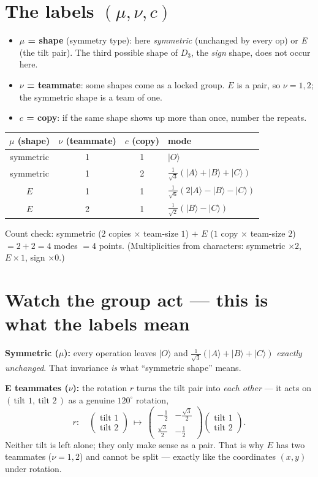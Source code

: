 \documentclass[11pt]{article}
\newcommand{\ket}[1]{\lvert #1\rangle}
\begin{document}
\section{The labels $(\mu,\nu,c)$}
\begin{itemize}\itemsep1pt
\item \textbf{$\mu$ = shape} (symmetry type): here \emph{symmetric} (unchanged by every op) or \emph{E}
      (the tilt pair). The third possible shape of $D_3$, the \emph{sign} shape, does not occur here.
\item \textbf{$\nu$ = teammate}: some shapes come as a locked group. $E$ is a pair, so $\nu=1,2$;
      the symmetric shape is a team of one.
\item \textbf{$c$ = copy}: if the same shape shows up more than once, number the repeats.
\end{itemize}

\begin{center}\begin{tabular}{cccl}
\toprule
$\mu$ (shape) & $\nu$ (teammate) & $c$ (copy) & mode \\
\midrule
symmetric & 1 & 1 & $\ket{O}$ \\
symmetric & 1 & 2 & $\tfrac{1}{\sqrt3}(\ket{A}+\ket{B}+\ket{C})$ \\
$E$ & 1 & 1 & $\tfrac{1}{\sqrt6}(2\ket{A}-\ket{B}-\ket{C})$ \\
$E$ & 2 & 1 & $\tfrac{1}{\sqrt2}(\ket{B}-\ket{C})$ \\
\bottomrule
\end{tabular}\end{center}
Count check: symmetric ($2$ copies $\times$ team-size $1$) $+$ $E$ ($1$ copy $\times$ team-size $2$)
$=2+2=4$ modes $=4$ points. (Multiplicities from characters: symmetric $\times2$, $E\times1$, sign
$\times0$.)

\section{Watch the group act --- this is what the labels mean}
\textbf{Symmetric ($\mu$):} every operation leaves $\ket{O}$ and $\tfrac{1}{\sqrt3}(\ket A+\ket B+\ket C)$
\emph{exactly unchanged}. That invariance \emph{is} what ``symmetric shape'' means.

\textbf{E teammates ($\nu$):} the rotation $r$ turns the tilt pair into \emph{each other} --- it acts on
$(\,\text{tilt }1,\ \text{tilt }2\,)$ as a genuine $120^\circ$ rotation,
\[
   r:\quad \begin{pmatrix}\text{tilt }1\\ \text{tilt }2\end{pmatrix}\ \longmapsto\
   \begin{pmatrix}-\tfrac12 & -\tfrac{\sqrt3}{2}\\[2pt] \tfrac{\sqrt3}{2} & -\tfrac12\end{pmatrix}
   \begin{pmatrix}\text{tilt }1\\ \text{tilt }2\end{pmatrix}.
\]
Neither tilt is left alone; they only make sense as a pair. That is why $E$ has two teammates
($\nu=1,2$) and cannot be split --- exactly like the coordinates $(x,y)$ under rotation.
\end{document}

